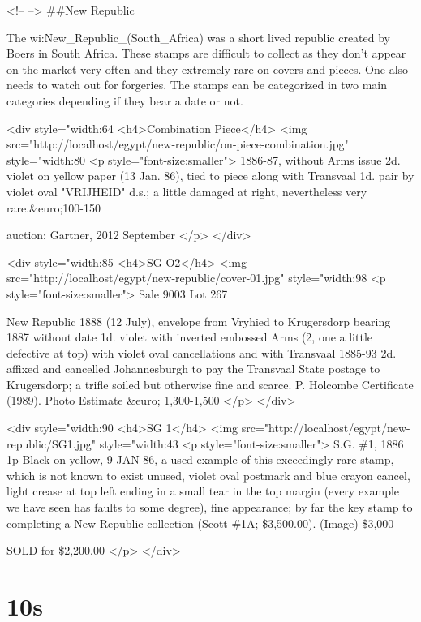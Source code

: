 
<!-- -->
\#\#New Republic

The wi:New_Republic_(South_Africa) was a short lived republic created by Boers in South Africa. These stamps are difficult to collect as they don't appear on the market very often and they extremely rare on covers and pieces. One also needs to watch out for forgeries. The stamps can be categorized in two main categories depending if they bear a date or not.

<div style="width:64%
<h4>Combination Piece</h4>
<img src="http://localhost/egypt/new-republic/on-piece-combination.jpg" style="width:80%
<p style="font-size:smaller"> 
1886-87, without Arms issue 2d. violet on yellow paper (13 Jan. 86), tied to piece along with Transvaal 1d. pair by violet oval "VRIJHEID" d.s.; a little damaged at right, nevertheless very rare.&euro;100-150

auction: Gartner, 2012 September 
</p>
</div>   




<div style="width:85%
<h4>SG O2</h4>
<img src="http://localhost/egypt/new-republic/cover-01.jpg" style="width:98%
<p style="font-size:smaller"> 
Sale 9003 Lot 267

New Republic
1888 (12 July), envelope from Vryhied to Krugersdorp bearing 1887 without date 1d. violet with inverted embossed Arms (2, one a little defective at top) with violet oval cancellations and with Transvaal 1885-93 2d. affixed and cancelled Johannesburgh to pay the Transvaal State postage to Krugersdorp; a trifle soiled but otherwise fine and scarce. P. Holcombe Certificate (1989). Photo
Estimate &euro; 1,300-1,500
</p>
</div>


<div style="width:90%
<h4>SG 1</h4>
<img src="http://localhost/egypt/new-republic/SG1.jpg" style="width:43%
<p style="font-size:smaller"> 
S.G. \#1, 1886 1p Black on yellow, 9 JAN 86, a used example of this exceedingly rare stamp, which is not known to exist unused, violet oval postmark and blue crayon cancel, light crease at top left ending in a small tear in the top margin (every example we have seen has faults to some degree), fine appearance; by far the key stamp to completing a New Republic collection (Scott \#1A; \$3,500.00). (Image) 	\$3,000

SOLD for \$2,200.00 
</p>
</div>

\section{10s}



